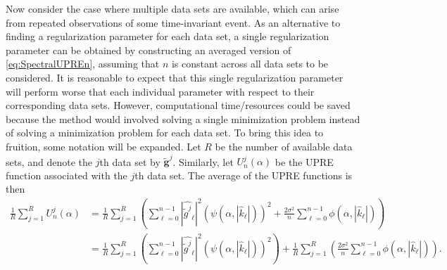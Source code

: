 \documentclass[12pt]{article}
\newcommand{\gnoise}{\widetilde{g}}	%
\newcommand{\gnoiseVec}{\widetilde{\mathbf{g}}}	%
\newcommand{\regparam}{\alpha}
\newcommand{\filt}{\phi}
\newcommand{\mfilt}{\psi}
\newcommand{\noiseSD}{\sigma}	%
\newcommand{\U}{U}	%
\begin{document}
Now consider the case where multiple data sets are available, which can arise from repeated observations of some time-invariant event. As an alternative to finding a regularization parameter for each data set, a single regularization parameter can be obtained by constructing an averaged version of \eqref{eq:SpectralUPREn}, assuming that $n$ is constant across all data sets to be considered. It is reasonable to expect that this single regularization parameter will perform worse that each individual parameter with respect to their corresponding data sets. However, computational time/resources could be saved because the method would involved solving a single minimization problem instead of solving a minimization problem for each data set. To bring this idea to fruition, some notation will be expanded. Let $R$ be the number of available data sets, and denote the $j$th data set by $\gnoiseVec^j$. Similarly, let $\U_n^j(\regparam)$ be the UPRE function associated with the $j$th data set.  The average of the UPRE functions is then 
\begin{align*}
\frac{1}{R}\sum_{j=1}^R \U_n^j(\regparam) &= \frac{1}{R}\sum_{j=1}^R \left(\sum_{\ell = 0}^{n-1} |\widehat{\gnoise^j}_\ell|^2(\mfilt(\regparam,|\widehat{k}_\ell|))^2 + \frac{2\noiseSD^2}{n}\sum_{\ell = 0}^{n-1} \filt(\regparam,|\widehat{k}_\ell|)\right) \\
&= \frac{1}{R}\sum_{j=1}^R \left(\sum_{\ell = 0}^{n-1} |\widehat{\gnoise^j}_\ell|^2(\mfilt(\regparam,|\widehat{k}_\ell|))^2\right) + \frac{1}{R}\sum_{j=1}^R \left(\frac{2\noiseSD^2}{n}\sum_{\ell = 0}^{n-1} \filt(\regparam,|\widehat{k}_\ell|)\right).
\end{align*}
\end{document}
